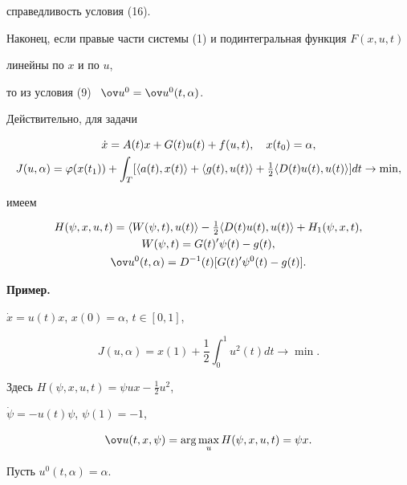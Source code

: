 справедливость условия (16). 





Наконец, если правые части системы (1) и подинтегральная функция $F(x,u,t)$


линейны по $x$ и по $u$,


то из условия (9) \ $\ov u^0=\ov u^0(t,\alpha)$.


Действительно, для задачи


\begin{gather*}


\Dot x=A(t)x+G(t)u(t)+f(u,t),\quad x(t_0)=\alpha, \\


J(u,\alpha)=\varphi(x(t_1))+\int_T [\la a(t),x(t)\ra+\la g(t),u(t)\ra+


\tfrac{1}{2}\la D(t)u(t),u(t)\ra ]dt \rightarrow \min, 


\end{gather*}


имеем


\begin{gather*}


H(\psi,x,u,t)=\la W(\psi,t),u(t)\ra


-\tfrac{1}{2}\la D(t)u(t),u(t)\ra+H_1(\psi,x,t), \\


%


W(\psi,t)=G(t)^{\prime}\psi(t)-g(t), \\


%


\ov u^0(t,\alpha)=D^{-1}(t)[G(t)^{\prime}\psi^0(t)-g(t)].


\end{gather*}





{\bf Пример.}


$\Dot x=u(t)x$, $x(0)=\alpha$, $t\in [0,1]$,


$$


J(u,\alpha)=x(1)+\frac{1}{2}\int_0^1 u^2(t)dt \rightarrow \min.


$$


Здесь $H(\psi,x,u,t)=\psi ux-\frac{1}{2} u^2$,


$\Dot \psi=-u(t)\psi$, $\psi(1)=-1$,


$$


\ov u (t,x,\psi)=\arg \max_u H(\psi,x,u,t)=\psi x.


$$


Пусть $u^0(t,\alpha)=\alpha$.



